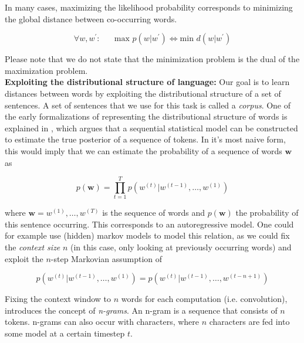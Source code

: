 \documentclass[a4paper,12pt,oneside,openright]{report}
\begin{document}
In many cases, maximizing the likelihood probability corresponds to minimizing the global distance between co-occurring words.

\begin{equation}
\forall w, w^{\prime} : \hspace{20pt} \text{max } p \left(w | w^{\prime}\right) \iff \text{min } d(w | w^{\prime})
\end{equation}

Please note that we do not state that the minimization problem is the dual of the maximization problem. \\

\textbf{Exploiting the distributional structure of language:} Our goal is to learn distances between words by exploiting the distributional structure of a set of sentences.
A set of sentences that we use for this task is called a \textit{corpus}. 
One of the early formalizations of representing the distributional structure of words is explained in \cite{bengio03}, which argues that a sequential statistical model can be constructed to estimate the true posterior of a sequence of tokens.  
In it's most naive form, this would imply that we can estimate the probability of a sequence of words $\mathbf{w}$ as

\begin{equation}
p(\mathbf{w}) = \prod_{t=1}^T p\left( w^{(t)} | w^{(t -1)}, \ldots, w^{(1)} \right)
\label{eq:naive_sequential_probability}
\end{equation}

where $\mathbf{w} = w^{(1)}, \dots, w^{(T)} $ is the sequence of words and $p(\mathbf{w})$ the probability of this sentence occurring.
This corresponds to an autoregressive model.
One could for example use (hidden) markov models to model this relation, as we could fix the \textit{context size} $n$ (in this case, only looking at previously occurring words) and exploit the $n$-step Markovian assumption of

\begin{equation}
p\left( w^{(t)} | w^{(t -1)}, \ldots, w^{(1)} \right) = p\left( w^{(t)} | w^{(t -1)}, \ldots, w^{(t - n + 1)} \right)
\end{equation}\label{eq:naive_sequential_probability_markovian}

Fixing the context window to $n$ words for each computation (i.e. convolution), introduces the concept of \textit{n-grams}. 
An n-gram is a sequence that consists of $n$ tokens.
n-grams can also occur with characters, where $n$ characters are fed into some model at a certain timestep $t$.
\end{document}
